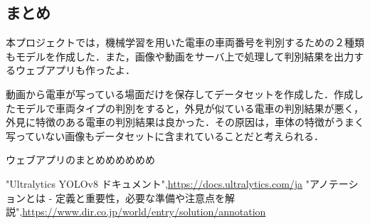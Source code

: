 \begin{multicols*}{2}
\section{まとめ}
本プロジェクトでは，機械学習を用いた電車の車両番号を判別するための２種類もモデルを作成した．また，画像や動画をサーバ上で処理して判別結果を出力するウェブアプリも作ったよ．

動画から電車が写っている場面だけを保存してデータセットを作成した．作成したモデルで車両タイプの判別をすると，外見が似ている電車の判別結果が悪く，外見に特徴のある電車の判別結果は良かった．その原因は，車体の特徴がうまく写っていない画像もデータセットに含まれていることだと考えられる．

ウェブアプリのまとめめめめめめ
\begin{thebibliography}{99}
"Ultralytics YOLOv8 ドキュメント",\url{https://docs.ultralytics.com/ja}
"アノテーションとは - 定義と重要性，必要な準備や注意点を解説",\url{https://www.dir.co.jp/world/entry/solution/annotation}
\end{thebibliography}


\end{multicols*} 


